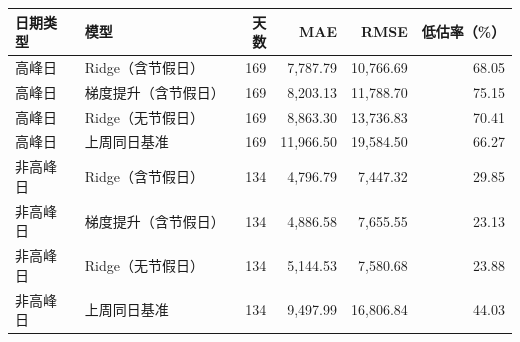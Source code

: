 \begin{tabular}{llrrrr}
\toprule
日期类型 & 模型 & 天数 & MAE & RMSE & 低估率（\%） \\
\midrule
高峰日 & Ridge（含节假日） & 169 & 7,787.79 & 10,766.69 & 68.05 \\
高峰日 & 梯度提升（含节假日） & 169 & 8,203.13 & 11,788.70 & 75.15 \\
高峰日 & Ridge（无节假日） & 169 & 8,863.30 & 13,736.83 & 70.41 \\
高峰日 & 上周同日基准 & 169 & 11,966.50 & 19,584.50 & 66.27 \\
非高峰日 & Ridge（含节假日） & 134 & 4,796.79 & 7,447.32 & 29.85 \\
非高峰日 & 梯度提升（含节假日） & 134 & 4,886.58 & 7,655.55 & 23.13 \\
非高峰日 & Ridge（无节假日） & 134 & 5,144.53 & 7,580.68 & 23.88 \\
非高峰日 & 上周同日基准 & 134 & 9,497.99 & 16,806.84 & 44.03 \\
\bottomrule
\end{tabular}
